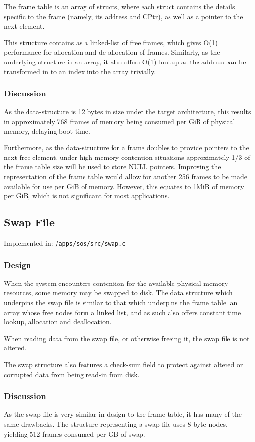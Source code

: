 \documentclass[a4paper,12pt]{article}
\begin{document}
The frame table is an array of structs, where each struct contains the details
specific to the frame (namely, its address and CPtr), as well as a pointer to
the next element.

This structure contains as a linked-list of free frames, which gives O(1)
performance for allocation and de-allocation of frames.  Similarly, as the
underlying structure is an array, it also offers O(1) lookup as the address
can be transformed in to an index into the array trivially.

\subsubsection{Discussion}
As the data-structure is 12 bytes in size under the target architecture, this
results in approximately 768 frames of memory being consumed per GiB of
physical memory, delaying boot time.

Furthermore, as the data-structure for a frame doubles to provide pointers to
the next free element, under high memory contention situations approximately
1/3 of the frame table size will be used to store NULL pointers.  Improving
the representation of the frame table would allow for another 256 frames to be
made available for use per GiB of memory.  However, this equates to 1MiB of
memory per GiB, which is not significant for most applications.

\subsection{Swap File}
Implemented in: \texttt{/apps/sos/src/swap.c}

\subsubsection{Design}
When the system encounters contention for the available physical memory
resources, some memory may be swapped to disk.  The data structure which
underpins the swap file is similar to that which underpins the frame table: an
array whose free nodes form a linked list, and as such also offers constant
time lookup, allocation and deallocation.

When reading data from the swap file, or otherwise freeing it, the swap file
is not altered.

The swap structure also features a check-sum field to protect against altered
or corrupted data from being read-in from disk.

\subsubsection{Discussion}
As the swap file is very similar in design to the frame table, it has many of
the same drawbacks.  The structure representing a swap file uses 8 byte nodes,
yielding 512 frames consumed per GB of swap.
\end{document}
